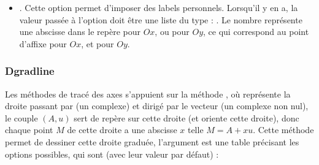 \begin{itemize}
\begin{itemize}
            \item {}. Cette option permet d'imposer des labels personnels. Lorsqu'il y en a, la valeur passée à l'option doit être une liste du type : . Le nombre  représente une abscisse dans le repère  pour $Ox$, ou  pour $Oy$, ce qui correspond au point d'affixe  pour $Ox$, et  pour $Oy$.
        \end{itemize}
\end{itemize}

\subsubsection{Dgradline}

Les méthodes de tracé des axes s'appuient sur la méthode , où  représente la droite passant par  (un complexe) et dirigé par le vecteur  (un complexe non nul), le couple $(A,u)$ sert de repère sur cette droite (et oriente cette droite), donc chaque point $M$ de cette droite a une abscisse $x$ telle $M=A+xu$. Cette méthode permet de dessiner cette droite graduée, l'argument  est une table précisant les options possibles, qui sont (avec leur valeur par défaut) :

